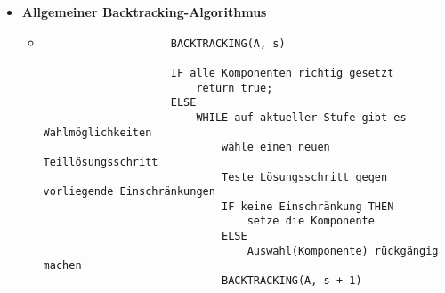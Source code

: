 \begin{itemize}
        \item \textbf{Allgemeiner Backtracking-Algorithmus}
            \begin{itemize}
                \item[]
                    \begin{verbatim}
                    BACKTRACKING(A, s)

                    IF alle Komponenten richtig gesetzt
                        return true;
                    ELSE
                        WHILE auf aktueller Stufe gibt es Wahlmöglichkeiten
                            wähle einen neuen Teillösungsschritt
                            Teste Lösungsschritt gegen vorliegende Einschränkungen
                            IF keine Einschränkung THEN
                                setze die Komponente
                            ELSE
                                Auswahl(Komponente) rückgängig machen
                            BACKTRACKING(A, s + 1)
                    \end{verbatim}
            \end{itemize}
    \end{itemize}

\pagebreak

